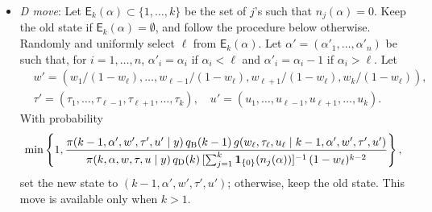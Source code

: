 \documentclass[12pt]{article}
\newcommand{\ind}{\mathbf{1}}
\begin{document}
\begin{itemize}
	\item {\it D move}:
	Let $\mathsf{E}_k(\alpha) \subset \{1,\dots,k\}$ be the set of $j$'s such that $n_j(\alpha) = 0$.
	Keep the old state if $\mathsf{E}_k(\alpha) = \emptyset$, and follow the procedure below otherwise.
	Randomly and uniformly select $\ell$ from $\mathsf{E}_k(\alpha)$.
	Let $\alpha' = (\alpha'_1, \dots, \alpha'_n)$ be such that, for $i = 1,\dots,n$, $\alpha'_i = \alpha_i$ if $\alpha_i < \ell$ and $\alpha'_i = \alpha_i - 1$ if $\alpha_i > \ell$.
	Let
	\[
	\begin{aligned}
		&w' = (w_1/(1-w_{\ell}), \dots, w_{\ell-1}/(1-w_{\ell}), w_{\ell+1}/(1-w_{\ell}), w_k/(1-w_{\ell})), \\
		&\tau' = (\tau_1, \dots, \tau_{\ell-1}, \tau_{\ell+1}, \dots, \tau_k), \quad u' = (u_1, \dots, u_{\ell-1}, u_{\ell+1}, \dots, u_k).
	\end{aligned}
	\]
	With probability
	\[
	\min \left\{ 1, \frac{\pi(k-1, \alpha', w', \tau', u' \mid y) \, q_{\scriptsize\mbox{B}}(k-1) \, g(w_{\ell}, \tau_{\ell}, u_{\ell} \mid k-1, \alpha', w', \tau', u') }{ \pi(k, \alpha, w, \tau, u \mid y) \,  q_{\scriptsize\mbox{D}}(k) \, [\sum_{j=1}^k \ind_{\{0\}}(n_j(\alpha)) ]^{-1} \, (1-w_{\ell})^{k-2}}  \right\},
	\]
	set the new state to $(k-1, \alpha', w', \tau', u')$; otherwise, keep the old state.
	This move is available only when $k > 1$.
\end{itemize}
\end{document}

